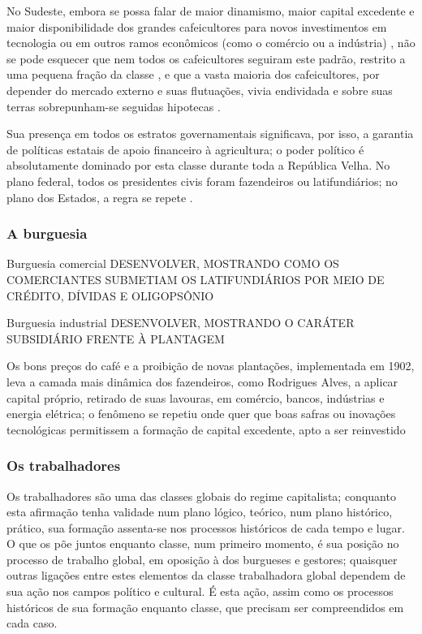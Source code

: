 No Sudeste, embora se possa falar de maior dinamismo, maior capital excedente e maior disponibilidade dos grandes cafeicultores para novos investimentos em tecnologia ou em outros ramos econômicos (como o comércio ou a indústria) \cite[p.~153-154]{CARONE1970inst}, não se pode esquecer que nem todos os cafeicultores seguiram este padrão, restrito a uma pequena fração da classe \cite[p.~32-38]{gorender_burguesia_1990}, e que a vasta maioria dos cafeicultores, por depender do mercado externo e suas flutuações, vivia endividada e sobre suas terras sobrepunham-se seguidas hipotecas \cite[p.~154]{CARONE1970inst}. 

Sua presença em todos os estratos governamentais significava, por isso, a garantia de políticas estatais de apoio financeiro à agricultura; o poder político é absolutamente dominado por esta classe durante toda a República Velha. No plano federal, todos os presidentes civis foram fazendeiros ou latifundiários; no plano dos Estados, a regra se repete \cite[p.~155]{CARONE1970inst}.

\subsubsection{A burguesia}\label{subsubsec:claburg}

Burguesia comercial DESENVOLVER, MOSTRANDO COMO OS COMERCIANTES SUBMETIAM OS LATIFUNDIÁRIOS POR MEIO DE CRÉDITO, DÍVIDAS E OLIGOPSÔNIO

Burguesia industrial DESENVOLVER, MOSTRANDO O CARÁTER SUBSIDIÁRIO FRENTE À PLANTAGEM

Os bons preços do café e a proibição de novas plantações, implementada em 1902, leva a camada mais dinâmica dos fazendeiros, como Rodrigues Alves, a aplicar capital próprio, retirado de suas lavouras, em comércio, bancos, indústrias e energia elétrica; o fenômeno se repetiu onde quer que boas safras ou inovações tecnológicas permitissem a formação de capital excedente, apto a ser reinvestido \cite[p.~147]{CARONE1970inst}

\subsubsection{Os trabalhadores}\label{subsubsec:clatrab}

Os trabalhadores são uma das classes globais do regime capitalista; conquanto esta afirmação tenha validade num plano lógico, teórico, num plano histórico, prático, sua formação assenta-se nos processos históricos de cada tempo e lugar. O que os põe juntos enquanto classe, num primeiro momento, é sua posição no processo de trabalho global, em oposição à dos burgueses e gestores; quaisquer outras ligações entre estes elementos da classe trabalhadora global dependem de sua ação nos campos político e cultural. É esta ação, assim como os processos históricos de sua formação enquanto classe, que precisam ser compreendidos em cada caso.

